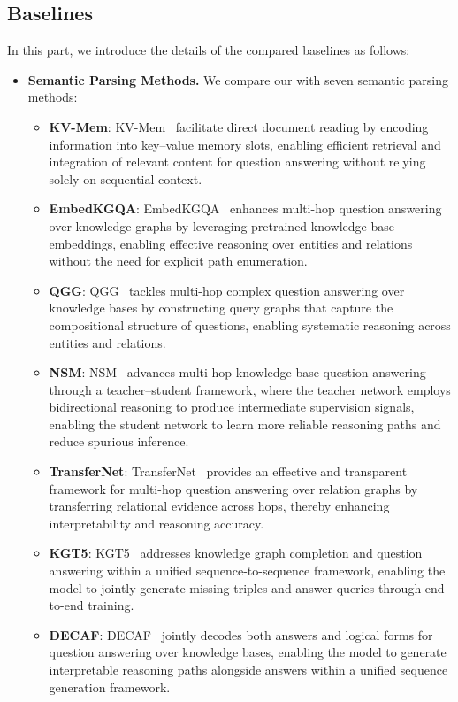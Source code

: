 \subsection{ Baselines}\label{sec:baseline}

In this part, we introduce the details of the compared baselines as follows:

\begin{itemize}

\item \textbf{Semantic Parsing Methods.} We compare our \method{} with seven semantic parsing methods:

\begin{itemize}
    \item \textbf{KV-Mem}: KV-Mem~\cite{miller2016key} facilitate direct document reading by encoding information into key–value memory slots, enabling efficient retrieval and integration of relevant content for question answering without relying solely on sequential context.
    \item \textbf{EmbedKGQA}: EmbedKGQA~\cite{saxena2020improving} enhances multi-hop question answering over knowledge graphs by leveraging pretrained knowledge base embeddings, enabling effective reasoning over entities and relations without the need for explicit path enumeration.
    \item \textbf{QGG}: QGG~\cite{lan2020query} tackles multi-hop complex question answering over knowledge bases by constructing query graphs that capture the compositional structure of questions, enabling systematic reasoning across entities and relations.
    \item \textbf{NSM}: NSM~\cite{he2021improving} advances multi-hop knowledge base question answering through a teacher–student framework, where the teacher network employs bidirectional reasoning to produce intermediate supervision signals, enabling the student network to learn more reliable reasoning paths and reduce spurious inference.
    \item \textbf{TransferNet}: TransferNet~\cite{shi2021transfernet} provides an effective and transparent framework for multi-hop question answering over relation graphs by transferring relational evidence across hops, thereby enhancing interpretability and reasoning accuracy.
    \item \textbf{KGT5}: KGT5~\cite{saxena2022sequence} addresses knowledge graph completion and question answering within a unified sequence-to-sequence framework, enabling the model to jointly generate missing triples and answer queries through end-to-end training.
    \item \textbf{DECAF}: DECAF~\cite{yu2022decaf} jointly decodes both answers and logical forms for question answering over knowledge bases, enabling the model to generate interpretable reasoning paths alongside answers within a unified sequence generation framework.
    

\end{itemize}
\end{itemize}
